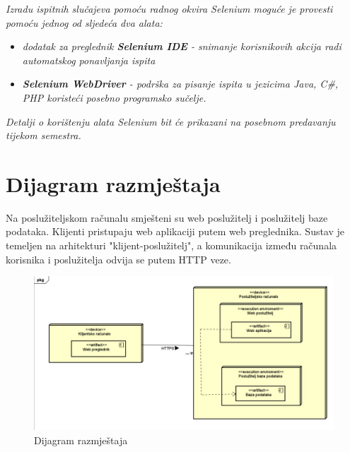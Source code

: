 			 \textit{Izradu ispitnih slučajeva pomoću radnog okvira Selenium moguće je provesti pomoću jednog od sljedeća dva alata:}
			 \begin{itemize}
			 	\item \textit{dodatak za preglednik \textbf{Selenium IDE} - snimanje korisnikovih akcija radi automatskog ponavljanja ispita	}
			 	\item \textit{\textbf{Selenium WebDriver} - podrška za pisanje ispita u jezicima Java, C\#, PHP koristeći posebno programsko sučelje.}
			 \end{itemize}
		 	\textit{Detalji o korištenju alata Selenium bit će prikazani na posebnom predavanju tijekom semestra.}
			
			\eject 
		
		
		\section{Dijagram razmještaja}
			
			
			
			Na poslužiteljskom računalu smješteni su web poslužitelj i poslužitelj baze podataka. Klijenti pristupaju web aplikaciji putem web preglednika. Sustav je temeljen na arhitekturi "klijent-poslužitelj", a komunikacija između računala korisnika i poslužitelja odvija se putem HTTP veze.
			
			\begin{figure}[H]
				\includegraphics[width=\textwidth]{dijagram_razmjestaja.JPEG}
				\centering
				\caption{Dijagram razmještaja}
				\label{fig:dijagramrazmjestaja}
			\end{figure}
			
